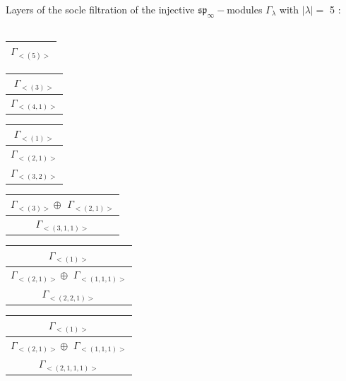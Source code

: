 \bigskip
Layers of the socle filtration of the injective $\mathfrak{sp}_\infty-$modules $\Gamma_{\lambda}$ with $|\lambda| = $ 5 : \\\\
\begin{minipage}{.25\textwidth}
\centering
\begin{tabular}{|c|}\hline
$\Gamma_{<(
5
)>}$
\\
\hline\end{tabular}\end{minipage}
\begin{minipage}{.25\textwidth}
\centering
\begin{tabular}{|c|}\hline
$\Gamma_{<(
3
)>}$
\\ \hline
$\Gamma_{<(
4 , 
1
)>}$
\\
\hline\end{tabular}\end{minipage}
\begin{minipage}{.25\textwidth}
\centering
\begin{tabular}{|c|}\hline
$\Gamma_{<(
1
)>}$
\\ \hline
$\Gamma_{<(
2 , 
1
)>}$
\\ \hline
$\Gamma_{<(
3 , 
2
)>}$
\\
\hline\end{tabular}\end{minipage}
\begin{minipage}{.25\textwidth}
\centering
\begin{tabular}{|c|}\hline
$\Gamma_{<(
3
)>} \oplus$
$\Gamma_{<(
2 , 
1
)>}$
\\ \hline
$\Gamma_{<(
3 , 
1 , 
1
)>}$
\\
\hline\end{tabular}\end{minipage}
\bigskip
\begin{minipage}{.33\textwidth}
\centering
\begin{tabular}{|c|}\hline
$\Gamma_{<(
1
)>}$
\\ \hline
$\Gamma_{<(
2 , 
1
)>} \oplus$
$\Gamma_{<(
1 , 
1 , 
1
)>}$
\\ \hline
$\Gamma_{<(
2 , 
2 , 
1
)>}$
\\
\hline\end{tabular}\end{minipage}
\begin{minipage}{.33\textwidth}
\centering
\begin{tabular}{|c|}\hline
$\Gamma_{<(
1
)>}$
\\ \hline
$\Gamma_{<(
2 , 
1
)>} \oplus$
$\Gamma_{<(
1 , 
1 , 
1
)>}$
\\ \hline
$\Gamma_{<(
2 , 
1 , 
1 , 
1
)>}$
\\
\hline\end{tabular}\end{minipage}
